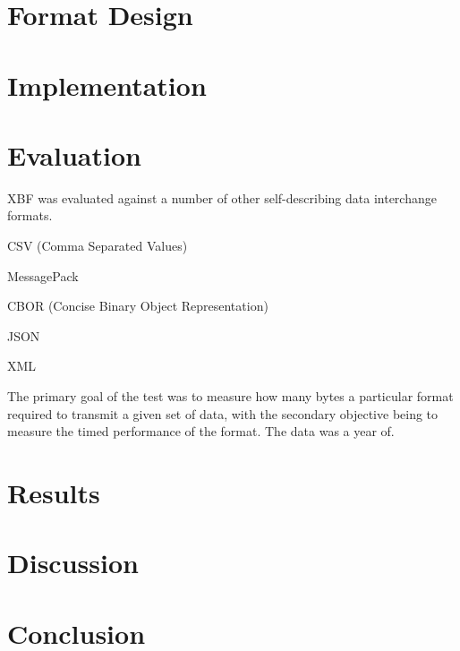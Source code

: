 \documentclass[conference]{IEEEtran}
\begin{document}
\section{Format Design}

\section{Implementation}

\section{Evaluation}

XBF was evaluated against a number of other self-describing data interchange formats.

\begin{IEEEitemize}
	\item CSV (Comma Separated Values) \cite{csv_spec}\cite{csv_parser}
	\item MessagePack \cite{msgpack_spec}\cite{msgpack_parser}
	\item CBOR (Concise Binary Object Representation) \cite{cbor_spec}\cite{cbor_parser}
	\item JSON \cite{json_parser}
	\item XML \cite{xml_parser}
\end{IEEEitemize}

The primary goal of the test was to measure how many bytes a particular format required to transmit a given set of data, with the secondary objective being to measure the timed performance of the format. The data\cite{sony_stock_data} was a year of.

\section{Results}

\section{Discussion}

\section{Conclusion}

\section{}
\end{document}
